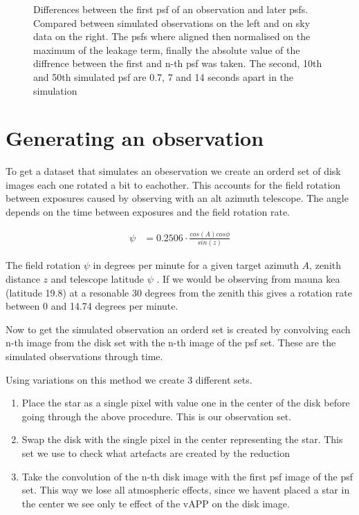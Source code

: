 \begin{figure}[h!]

  \caption{Differences between the first psf of an observation and later psfs. Compared between simulated observations on the left and on sky data on the right. The psfs where aligned then normalised on the maximum of the leakage term, finally the absolute value of the diffrence between the first and n-th psf was taken. The second, 10th and 50th simulated psf are 0.7, 7 and 14 seconds apart in the simulation}
  \label{fig:psfs_evolving}
\end{figure}






\section{Generating an observation}

To get a dataset that simulates an obeservation we create an orderd set of disk images each one rotated a bit to eachother. This accounts for the field rotation between exposures caused by observing with an alt azimuth telescope. The angle depends on the time between exposures and the field rotation rate.

\begin{align}
  \psi &= 0.2506 \cdot \frac{cos(A) cos \phi}{sin(z)} 
\end{align}

The field rotation $\psi$ in degrees per minute for a given target azimuth $A$, zenith distance $z$ and telescope latitude $\psi$ \cite[page 95]{Electronic_imaging}. If we would be observing from mauna kea (latitude 19.8) at a resonable 30 degrees from the zenith this gives a rotation rate between 0 and  14.74 degrees per minute.

Now to get the simulated observation an orderd set is created by convolving each n-th image from the disk set with the n-th image of the psf set. These are the simulated observations through time. 

Using variations on this method we create 3 different sets.

\begin{enumerate}
\item Place the star as a single pixel with value one in the center of the disk before going through the above procedure. This is our observation set.
\item Swap the disk with the single pixel in the center representing the star. This set we use to check what artefacts are created by the reduction 
\item Take the convolution of the n-th disk image with the first psf image of the psf set. This way we lose all atmospheric effects, since we havent placed a star in the center we see only te effect of the \ac{vAPP} on the disk image. 
\end{enumerate}
